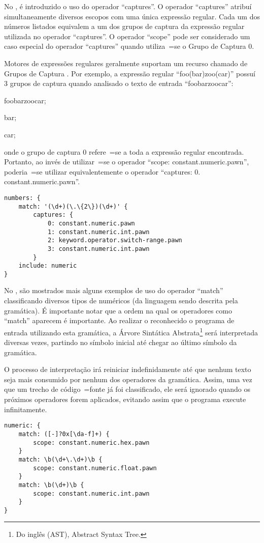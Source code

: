No ,
é introduzido o uso do operador ``captures''.
O operador ``captures'' atribuí simultaneamente diversos escopos com uma única expressão regular.
Cada um dos números listados equivalem a um dos grupos de captura da expressão regular utilizada no operador ``captures''.
O operador ``scope'' pode ser considerado um caso especial do operador ``captures'' quando utiliza~=se o Grupo de Captura 0.

Motores de expressões regulares geralmente suportam um recurso chamado de Grupos de Captura \cite{expressionGrammarsWithRegexLikeCaptures}.
Por exemplo,
a expressão regular ``foo(bar)zoo(car)'' possuí 3 grupos de captura quando analisado o texto de entrada ``foobarzoocar'':
\begin{inparaenum}[1)]\setcounter{enumi}{-1}
\item foobarzoocar;
\item bar;
\item car;
\end{inparaenum}%
onde o grupo de captura 0 refere~=se a toda a expressão regular encontrada.
Portanto,
ao invés de utilizar~=se o operador ``scope:
constant.numeric.pawn'',
poderia~=se utilizar equivalentemente o operador ``captures:
0.
constant.numeric.pawn''.
\begin{lstlisting}[caption={Exemplo de Gramática, Grupos de Captura},label={exemploDeGramaticaPawn3},style=yaml_style]
numbers: {
    match: '(\d+)(\.\{2\})(\d+)' {
        captures: {
            0: constant.numeric.pawn
            1: constant.numeric.int.pawn
            2: keyword.operator.switch-range.pawn
            3: constant.numeric.int.pawn
        }
    include: numeric
}
\end{lstlisting}

No ,
são mostrados mais alguns exemplos de uso do operador ``match'' classificando diversos tipos de numéricos (da linguagem sendo descrita pela gramática).
É importante notar que a ordem na qual os operadores como ``match'' aparecem é importante.
Ao realizar o reconhecido o programa de entrada utilizando esta gramática,
a Árvore Sintática Abstrata\footnote{%
Do inglês (AST), Abstract Syntax Tree.
} \cite{ahoCompilerDragonBook} será interpretada diversas vezes,
partindo no símbolo inicial até chegar ao último símbolo da gramática.

O processo de interpretação irá reiniciar indefinidamente até que nenhum texto seja mais consumido por nenhum dos operadores da gramática.
Assim,
uma vez que um trecho de código~=fonte já foi classificado,
ele será ignorado quando os próximos operadores forem aplicados,
evitando assim que o programa execute infinitamente.
\begin{lstlisting}[caption={Exemplo de Gramática, Tipos numéricos},label={exemploDeGramaticaPawn4},style=yaml_style]
numeric: {
    match: ([-]?0x[\da-f]+) {
        scope: constant.numeric.hex.pawn
    }
    match: \b(\d+\.\d+)\b {
        scope: constant.numeric.float.pawn
    }
    match: \b(\d+)\b {
        scope: constant.numeric.int.pawn
    }
}
\end{lstlisting}

